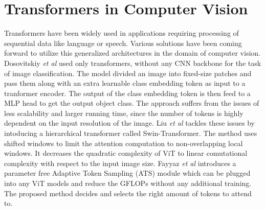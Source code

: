 \section{Transformers in Computer Vision}
\par Transformers \cite{tfm} have been widely used in applications requiring processing of sequential data like language or speech. Various solutions have been coming forward to utilize this generalized architectures in the domain of computer vision. Dosovitskiy \textit{et al} \cite{ViT} used only transformers, without any CNN backbone for the task of image classification. The model divided an image into fixed-size patches and pass them along with an extra learnable class embedding token as input to a tranformer encoder. The output of the class embedding token is then feed to a MLP head to get the output object class. The approach suffers from the issues of less scalability and larger running time, since the number of tokens is highly dependent on the input resolution of the image. Liu \textit{et al} \cite{Swin} tackles these issues by intoducing a hierarchical transformer called Swin-Transformer. The method uses shifted windows to limit the attention computation to non-overlapping local windows. It decreases the quadratic complexity of ViT to linear comutational complexity with respect to the input image size. Fayyaz \textit{et al} \cite{ATS} introduces a parameter free Adaptive Token Sampling (ATS) module which can be plugged into any ViT models and reduce the GFLOPs without any additional training. The proposed method decides and selects the right amount of tokens to attend to. 
